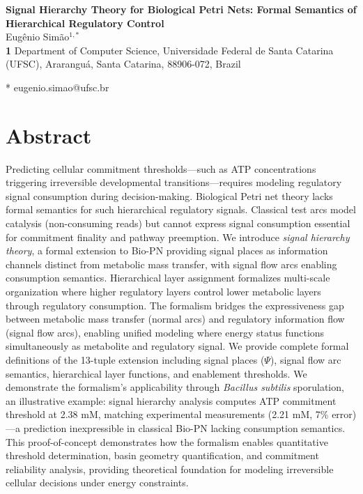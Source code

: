 \documentclass[10pt,letterpaper]{article}
\begin{document}
\vspace*{0.2in}

\begin{flushleft}
{\Large
\textbf{Signal Hierarchy Theory for Biological Petri Nets: Formal Semantics of Hierarchical Regulatory Control}
}
\newline
\\
Eug\^enio Sim\~ao$^{1,*}$
\\
\bigskip
\textbf{1} Department of Computer Science, Universidade Federal de Santa Catarina (UFSC), Ararangu\'a, Santa Catarina, 88906-072, Brazil
\\
\bigskip

* eugenio.simao@ufsc.br

\end{flushleft}

\section*{Abstract}
Predicting cellular commitment thresholds---such as ATP concentrations triggering irreversible developmental transitions---requires modeling regulatory signal consumption during decision-making. Biological Petri net theory lacks formal semantics for such hierarchical regulatory signals. Classical test arcs model catalysis (non-consuming reads) but cannot express signal consumption essential for commitment finality and pathway preemption. We introduce \textit{signal hierarchy theory}, a formal extension to Bio-PN providing signal places as information channels distinct from metabolic mass transfer, with signal flow arcs enabling consumption semantics. Hierarchical layer assignment formalizes multi-scale organization where higher regulatory layers control lower metabolic layers through regulatory consumption. The formalism bridges the expressiveness gap between metabolic mass transfer (normal arcs) and regulatory information flow (signal flow arcs), enabling unified modeling where energy status functions simultaneously as metabolite and regulatory signal. We provide complete formal definitions of the 13-tuple extension including signal places ($\Psi$), signal flow arc semantics, hierarchical layer functions, and enablement thresholds. We demonstrate the formalism's applicability through \textit{Bacillus subtilis} sporulation, an illustrative example: signal hierarchy analysis computes ATP commitment threshold at 2.38 mM, matching experimental measurements (2.21 mM, 7\% error)---a prediction inexpressible in classical Bio-PN lacking consumption semantics. This proof-of-concept demonstrates how the formalism enables quantitative threshold determination, basin geometry quantification, and commitment reliability analysis, providing theoretical foundation for modeling irreversible cellular decisions under energy constraints.
\end{document}
